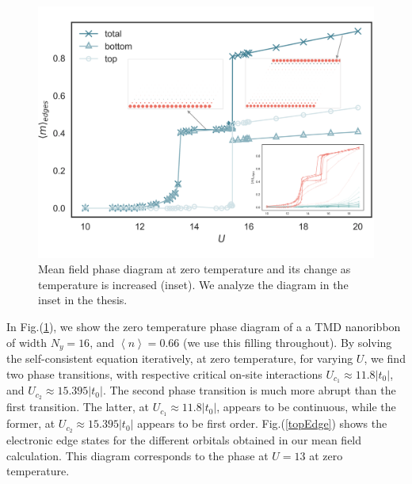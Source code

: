 \begin{figure}[H]
\includegraphics[trim={0cm 1.6cm 0cm 1.6cm},clip, scale =0.21]{images/edgeMagInsetBeta.pdf}
	\caption{Mean field phase diagram at zero temperature and its change as temperature is increased (inset). We analyze the diagram in the inset in the thesis.\label{fig:mfPhaseDiag0}}
\end{figure}
In Fig.(\ref{fig:mfPhaseDiag0}), we show the zero temperature phase diagram of a a TMD nanoribbon of width $N_y = 16$, and $\left\langle n \right\rangle = 0.66$ (we use this filling throughout).
By solving the self-consistent equation iteratively, at zero temperature, for varying $U$, we find two phase transitions, with respective critical on-site interactions $U_{c_1} \approx 11.8 |t_0|$, and $U_{c_2} \approx 15.395 |t_0|$.
The second phase transition is much more abrupt than the first transition.
The latter, at $U_{c_1} \approx 11.8 |t_0|$,  appears to be continuous, while the former,  at $U_{c_2} \approx 15.395 |t_0|$ appears to be first order.
Fig.(\ref{topEdge}) shows the electronic edge states for the different orbitals obtained in our mean field calculation.
This diagram corresponds to the phase at $U=13$ at zero temperature.
